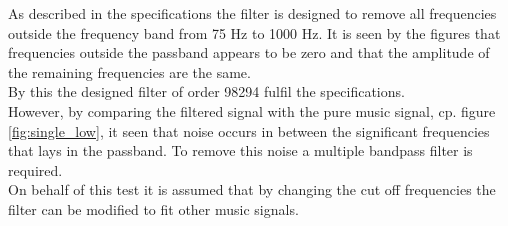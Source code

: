 As described in the specifications the filter is designed to remove all frequencies outside the frequency band from 75 Hz to 1000 Hz. It is seen by the figures that frequencies outside the passband appears to be zero and that the amplitude of the remaining frequencies are the same. \\
By this the designed filter of order 98294 fulfil the specifications.\\
However, by comparing the filtered signal with the pure music signal, cp. figure \ref{fig:single_low}, it seen that noise occurs in between the significant frequencies that lays in the passband. To remove this noise a multiple bandpass filter is required. \\
On behalf of this test it is assumed that by changing the cut off frequencies the filter can be modified to fit other music signals.  